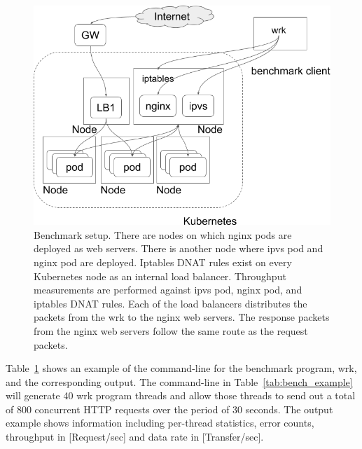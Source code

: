 \begin{figure}[h]
  \centering
  \includegraphics[width=0.8\columnwidth]{Figs/benchmark-schem}
  \par\bigskip
  \centering
  \begin{minipage}{0.9\columnwidth}
    \caption[Benchmark setup]{
      Benchmark setup.
      There are nodes on which nginx pods are deployed as web servers.
      There is another node where ipvs pod and nginx pod are deployed.
      Iptables DNAT rules exist on every Kubernetes node as an internal load balancer.
      Throughput measurements are performed against ipvs pod, nginx pod, and iptables DNAT rules.
      Each of the load balancers distributes the packets from the wrk to the nginx web servers.
      The response packets from the nginx web servers follow the same route as the request packets.  
    }
    \label{fig:benchmark-schem}
  \end{minipage}
\end{figure}

Table~\ref{fig:benchmark-schem} shows an example of the command-line for the benchmark program, wrk, and the corresponding output.
The command-line in Table~\ref{tab:bench_example} will generate 40 wrk program threads
and allow those threads to send out a total of 800 concurrent HTTP requests over the period of 30 seconds.
The output example shows information including per-thread statistics, error counts, throughput in [Request/sec] and data rate in [Transfer/sec].


